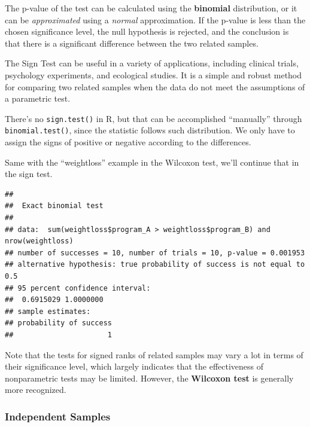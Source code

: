 \documentclass[
]{ctexart}
\newenvironment{Shaded}{\begin{snugshade}}{\end{snugshade}}
\newcommand{\AttributeTok}[1]{\textcolor[rgb]{0.13,0.29,0.53}{#1}}
\newcommand{\FunctionTok}[1]{\textcolor[rgb]{0.13,0.29,0.53}{\textbf{#1}}}
\newcommand{\NormalTok}[1]{#1}
\newcommand{\SpecialCharTok}[1]{\textcolor[rgb]{0.81,0.36,0.00}{\textbf{#1}}}
\begin{document}
The p-value of the test can be calculated using the \textbf{binomial}
distribution, or it can be \emph{approximated} using a \emph{normal}
approximation. If the p-value is less than the chosen significance
level, the null hypothesis is rejected, and the conclusion is that there
is a significant difference between the two related samples.

The Sign Test can be useful in a variety of applications, including
clinical trials, psychology experiments, and ecological studies. It is a
simple and robust method for comparing two related samples when the data
do not meet the assumptions of a parametric test.

There's no \texttt{sign.test()} in R, but that can be accomplished
``manually'' through \texttt{binomial.test()}, since the statistic
follows such distribution. We only have to assign the signs of positive
or negative according to the differences.

Same with the ``weightloss'' example in the Wilcoxon test, we'll
continue that in the sign test.

\begin{Shaded}
\end{Shaded}

\begin{verbatim}
## 
##  Exact binomial test
## 
## data:  sum(weightloss$program_A > weightloss$program_B) and nrow(weightloss)
## number of successes = 10, number of trials = 10, p-value = 0.001953
## alternative hypothesis: true probability of success is not equal to 0.5
## 95 percent confidence interval:
##  0.6915029 1.0000000
## sample estimates:
## probability of success 
##                      1
\end{verbatim}

Note that the tests for signed ranks of related samples may vary a lot
in terms of their significance level, which largely indicates that the
effectiveness of nonparametric tests may be limited. However, the
\textbf{Wilcoxon test} is generally more recognized.

\hypertarget{independent-samples}{%
\subsubsection{Independent Samples}\label{independent-samples}}
\end{document}
